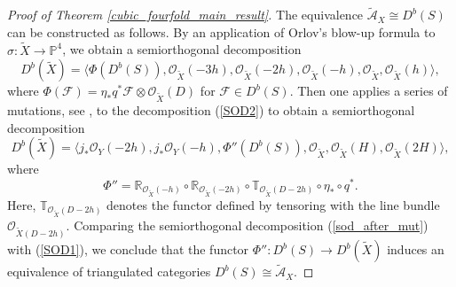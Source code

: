 \documentclass[a4paper, twoside, 11pt]{amsart}
\theoremstyle{definition}
\theoremstyle{remark}
\numberwithin{equation}{theorem}
\begin{document}
\begin{proof}[Proof of Theorem \ref{cubic_fourfold_main_result}]
    The equivalence $\widetilde{\mathcal{A}}_X \cong D^b(S)$ can be constructed as follows. By an application of Orlov's blow-up formula to $\sigma\colon \widetilde{X} \to \mathbb{P}^4$, we obtain a semiorthogonal decomposition 
  	\begin{equation}\label{SOD2}
  		D^b(\widetilde{X}) = \langle \Phi(D^b(S)), \mathcal{O}_{\widetilde{X}}(-3h), \mathcal{O}_{\widetilde{X}}(-2h),\mathcal{O}_{\widetilde{X}}(-h),\mathcal{O}_{\widetilde{X}},\mathcal{O}_{\widetilde{X}}(h) \rangle,
  	\end{equation}
  	where $\Phi(\mathcal{F}) = \eta_*q^*\mathcal{F}\otimes \mathcal{O}_{\widetilde{X}}(D)$ for $\mathcal{F} \in D^b(S)$. Then one applies a series of mutations, see \cite[Theorem 5.2]{dervied_cat_cubic_fourfold}, to the decomposition (\ref{SOD2}) to obtain a semiorthogonal decomposition 
  	\begin{equation}\label{sod_after_mut}
  		D^b(\widetilde{X})= \langle j_*\mathcal{O}_Y(-2h), j_*\mathcal{O}_Y(-h), \Phi''(D^b(S)), \mathcal{O}_{\widetilde{X}},\mathcal{O}_{\widetilde{X}}(H),\mathcal{O}_{\widetilde{X}}(2H) \rangle,
  	\end{equation}
  	where 
    \begin{equation*}
        \Phi'' = \mathbb{R}_{\mathcal{O}_{\widetilde{X}}(-h)} \circ \mathbb{R}_{\mathcal{O}_{\widetilde{X}}(-2h)} \circ \mathbb{T}_{\mathcal{O}_{\widetilde{X}}(D-2h)} \circ \eta_* \circ q^*.
    \end{equation*} 
    Here, $\mathbb{T}_{\mathcal{O}_{\widetilde{X}}(D-2h)}$ denotes the functor defined by tensoring with the line bundle $\mathcal{O}_{{\widetilde{X}}(D-2h)}$. Comparing the semiorthogonal decomposition (\ref{sod_after_mut}) with (\ref{SOD1}), we conclude that the functor $\Phi''\colon D^b(S) \to D^b(\widetilde{X})$ induces an equivalence of triangulated categories $D^b(S) \cong \widetilde{\mathcal{A}}_X$.


\end{proof}
\end{document}
